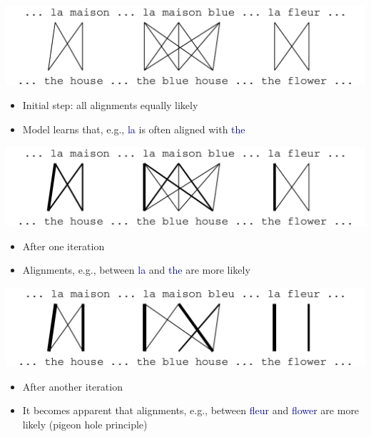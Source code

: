 \documentclass[landscape]{slides}
\newcommand{\example}[1]{\textcolor{darkblue}{\rm #1}}
\begin{document}

\vspace{10mm}
\begin{center}
\includegraphics[scale=0.9]{em1.pdf}
\end{center}
\begin{itemize}
\item Initial step: all alignments equally likely
\item Model learns that, e.g., \example{la} is often aligned with \example{the}
\end{itemize}



\vspace{10mm}
\begin{center}
\includegraphics[scale=0.9]{em2.pdf}
\end{center}
\begin{itemize}
\item After one iteration
\item Alignments, e.g., between \example{la} and \example{the} are more likely
\end{itemize}



\vspace{10mm}
\begin{center}
\includegraphics[scale=0.9]{em3.pdf}
\end{center}
\begin{itemize}
\item After another iteration
\item It becomes apparent that alignments, e.g., between \example{fleur}
  and \example{flower} are more likely (pigeon hole principle)
\end{itemize}
\end{document}
